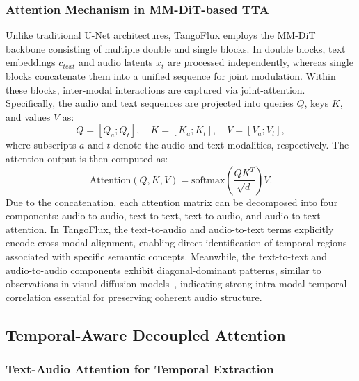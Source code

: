 \subsubsection{Attention Mechanism in MM-DiT-based TTA}
Unlike traditional U-Net architectures, TangoFlux employs the MM-DiT backbone consisting of multiple double and single blocks. In double blocks, text embeddings $c_{text}$ and audio latents $x_t$ are processed independently, whereas single blocks concatenate them into a unified sequence for joint modulation. Within these blocks, inter-modal interactions are captured via joint-attention. Specifically, the audio and text sequences are projected into queries $Q$, keys $K$, and values $V$ as:
\begin{equation}
Q = [Q_a; Q_t], \quad K = [K_a; K_t], \quad V = [V_a; V_t],
\end{equation}
where subscripts $a$ and $t$ denote the audio and text modalities, respectively. The attention output is then computed as:
\begin{equation}
\mathrm{Attention}(Q, K, V) = \text{softmax}\left(\frac{QK^T}{\sqrt{d}}\right)V.
\end{equation}
Due to the concatenation, each attention matrix can be decomposed into four components: audio-to-audio, text-to-text, text-to-audio, and audio-to-text attention. In TangoFlux, the text-to-audio and audio-to-text terms explicitly encode cross-modal alignment, enabling direct identification of temporal regions associated with specific semantic concepts. Meanwhile, the text-to-text and audio-to-audio components exhibit diagonal-dominant patterns, similar to observations in visual diffusion models~\cite{cai2025ditctrl}, indicating strong intra-modal temporal correlation essential for preserving coherent audio structure.

\subsection{Temporal-Aware Decoupled Attention}

\subsubsection{Text-Audio Attention for Temporal Extraction}
\label{sec:te}


